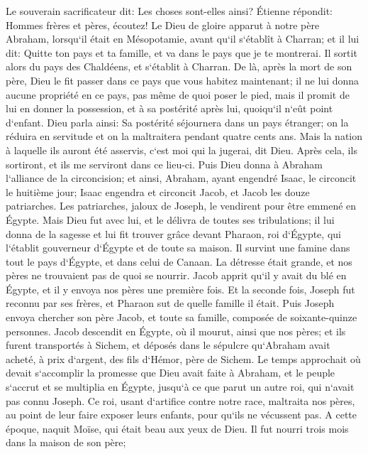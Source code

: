 \verse Le souverain sacrificateur dit: Les choses sont-elles ainsi? 
\verse Étienne répondit: Hommes frères et pères, écoutez! Le Dieu de gloire apparut à notre père Abraham, lorsqu`il était en Mésopotamie, avant qu`il s`établît à Charran; et il lui dit: 
\verse Quitte ton pays et ta famille, et va dans le pays que je te montrerai. 
\verse Il sortit alors du pays des Chaldéens, et s`établit à Charran. De là, après la mort de son père, Dieu le fit passer dans ce pays que vous habitez maintenant; 
\verse il ne lui donna aucune propriété en ce pays, pas même de quoi poser le pied, mais il promit de lui en donner la possession, et à sa postérité après lui, quoiqu`il n`eût point d`enfant. 
\verse Dieu parla ainsi: Sa postérité séjournera dans un pays étranger; on la réduira en servitude et on la maltraitera pendant quatre cents ans. 
\verse Mais la nation à laquelle ils auront été asservis, c`est moi qui la jugerai, dit Dieu. Après cela, ils sortiront, et ils me serviront dans ce lieu-ci. 
\verse Puis Dieu donna à Abraham l`alliance de la circoncision; et ainsi, Abraham, ayant engendré Isaac, le circoncit le huitième jour; Isaac engendra et circoncit Jacob, et Jacob les douze patriarches. 
\verse Les patriarches, jaloux de Joseph, le vendirent pour être emmené en Égypte. 
\verse Mais Dieu fut avec lui, et le délivra de toutes ses tribulations; il lui donna de la sagesse et lui fit trouver grâce devant Pharaon, roi d`Égypte, qui l`établit gouverneur d`Égypte et de toute sa maison. 
\verse Il survint une famine dans tout le pays d`Égypte, et dans celui de Canaan. La détresse était grande, et nos pères ne trouvaient pas de quoi se nourrir. 
\verse Jacob apprit qu`il y avait du blé en Égypte, et il y envoya nos pères une première fois. 
\verse Et la seconde fois, Joseph fut reconnu par ses frères, et Pharaon sut de quelle famille il était. 
\verse Puis Joseph envoya chercher son père Jacob, et toute sa famille, composée de soixante-quinze personnes. 
\verse Jacob descendit en Égypte, où il mourut, ainsi que nos pères; 
\verse et ils furent transportés à Sichem, et déposés dans le sépulcre qu`Abraham avait acheté, à prix d`argent, des fils d`Hémor, père de Sichem. 
\verse Le temps approchait où devait s`accomplir la promesse que Dieu avait faite à Abraham, et le peuple s`accrut et se multiplia en Égypte, 
\verse jusqu`à ce que parut un autre roi, qui n`avait pas connu Joseph. 
\verse Ce roi, usant d`artifice contre notre race, maltraita nos pères, au point de leur faire exposer leurs enfants, pour qu`ils ne vécussent pas. 
\verse A cette époque, naquit Moïse, qui était beau aux yeux de Dieu. Il fut nourri trois mois dans la maison de son père; 
